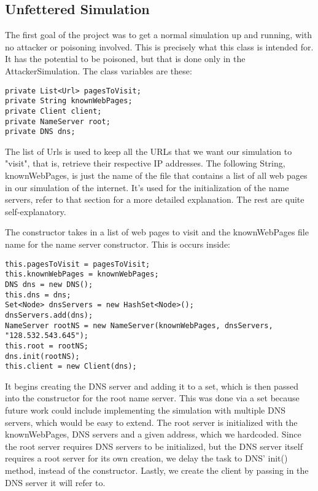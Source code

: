 \documentclass[a4paper, 12pt]{article} %
\begin{document}
\subsection*{Unfettered Simulation}

The first goal of the project was to get a normal simulation up and running, with no attacker or poisoning involved. This is precisely what this class is intended for. It has the potential to be poisoned, but that is done only in the AttackerSimulation. The class variables are these:

\begin{lstlisting}
private List<Url> pagesToVisit;
private String knownWebPages;
private Client client;
private NameServer root;
private DNS dns;
\end{lstlisting}

The list of Urls is used to keep all the URLs that we want our simulation to "visit", that is, retrieve their respective IP addresses. The following String, knownWebPages, is just the name of the file that contains a list of all web pages in our simulation of the internet. It's used for the initialization of the name servers, refer to that section for a more detailed explanation. The rest are quite self-explanatory.

The constructor takes in a list of web pages to visit and the knownWebPages file name for the name server constructor. This is occurs inside:
\begin{lstlisting}
this.pagesToVisit = pagesToVisit;
this.knownWebPages = knownWebPages;
DNS dns = new DNS();
this.dns = dns;
Set<Node> dnsServers = new HashSet<Node>();
dnsServers.add(dns);
NameServer rootNS = new NameServer(knownWebPages, dnsServers, "128.532.543.645");
this.root = rootNS;
dns.init(rootNS);
this.client = new Client(dns);
\end{lstlisting}

It begins creating the DNS server and adding it to a set, which is then passed into the constructor for the root name server. This was done via a set because future work could include implementing the simulation with multiple DNS servers, which would be easy to extend. The root server is initialized with the knownWebPages, DNS servers and a given address, which we hardcoded. Since the root server requires DNS servers to be initialized, but the DNS server itself requires a root server for its own creation, we delay the task to DNS' init() method, instead of the constructor. Lastly, we create the client by passing in the DNS server it will refer to.
\end{document}
